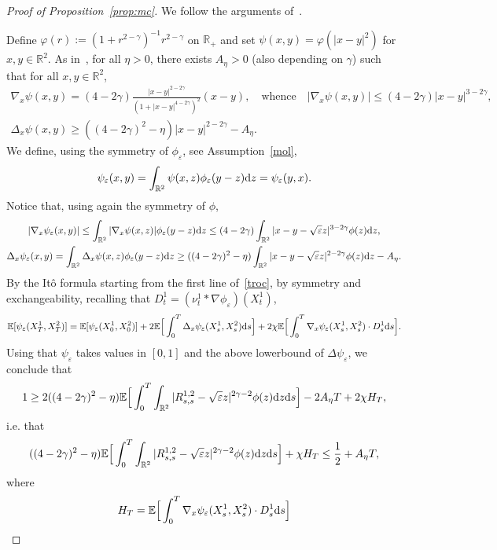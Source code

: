 \documentclass[11pt]{article}
\newcommand{\E}{\mathbb{E}}
\newcommand{\R}{\mathbb{R}}
\newcommand{\1}{\mathbbm{1}}
\newcommand{\dd}{{\rm d}}
\newcommand{\e}{\varepsilon}
\newcommand{\vip}{\vskip5pt}
\begin{document}
\begin{proof}[Proof of Proposition~\ref{prop:mc}]
We follow the arguments of~\cite[Proof of Proposition~8]{FT1}.

\vip

Define $\varphi(r):=(1+ r^{2-\gamma})^{-1}r^{2-\gamma}$ on $\R_+$ and set 
$\psi(x,y)=\varphi(|x-y|^2)$ for $x,y \in \R^2$. 
As in~\cite{FT1}, for all $\eta>0$, there exists $A_\eta>0$ (also depending on $\gamma$) such that for all $x,y \in \R^2$,
\begin{gather*}
\nabla_x \psi (x,y)= (4-2\gamma) \frac{|x-y|^{2-2\gamma}}{(1+|x-y|^{4-2\gamma})^2}(x-y), \quad \text{whence} \quad  |\nabla_x\psi(x,y)|\leq (4-2\gamma)|x-y|^{3-2\gamma},\\ 
\Delta_x \psi (x,y) \geq ((4-2\gamma)^2-\eta) |x-y|^{2-2\gamma}-A_\eta.
\end{gather*}
We define, using the symmetry of $\phi_\e$, see Assumption~\ref{mol},
$$
\psi_\e(x,y)=\int_{\R^2}\psi (x,z) \phi_\e(y-z)\dd z = \psi_\e(y,x).
$$
Notice that, using again the symmetry of $\phi$,
\begin{gather*}
|\nabla_x \psi_\e(x,y)|\leq \int_{\R^2} |\nabla_x \psi(x,z)|\phi_\e(y-z)\dd z
\leq (4-2\gamma) \int_{\R^2} |x-y-\sqrt{\e} z|^{3-2\gamma} \phi(z) \dd z,\\
\Delta_x \psi_\e(x,y)=\int_{\R^2} \Delta_x\psi (x,z) \phi_\e(y-z)\dd z  \geq 
((4-2\gamma)^2-\eta) \int_{\R^2} |x-y-\sqrt\e z|^{2-2\gamma}\phi(z)\dd z-A_\eta.
\end{gather*}
By the It\^o formula starting from the first line of~\eqref{troc}, by symmetry and exchangeability, recalling that $D^1_t= (\nu^1_t\ast \nabla \phi_\e)(X^1_t)$,
\begin{align*}
\E[\psi_\e (X^1_T,X^2_T)]=\E[\psi_\e (X^1_0,X^2_0)]+ 2\E\Big[\int_0^T \Delta_x \psi_\e (X^1_s,X^2_s) \dd s\Big]
+ 2\chi \E\Big[\int_0^T  \nabla_x \psi_\e (X^1_s,X^2_s) \cdot D^{1}_s\dd s  \Big].
\end{align*}
Using that $\psi_\e$ takes values in $[0,1]$ and the above lowerbound of $\Delta \psi_\e$, we conclude that
$$
1\geq 2 ((4-2\gamma)^2-\eta)\E\Big[\int_0^T\int_{\R^2} |R^{1,2}_{s,s}-\sqrt\e z|^{2\gamma-2} \phi(z)\dd z\dd s \Big] - 2A_\eta T+2 \chi H_T,
$$
i.e. that 
\begin{equation}\label{tbpi}
((4-2\gamma)^2-\eta)\E\Big[\int_0^T \int_{\R^2}|R^{1,2}_{s,s}-\sqrt\e z|^{2\gamma-2} \phi(z)\dd z \dd s \Big] +\chi H_T \leq  \frac 12+A_\eta T,
\end{equation}
where
$$
H_T=\E\Big[\int_0^T  \nabla_x \psi_\e (X^1_s,X^2_s) \cdot D^{1}_s\dd s  \Big]
$$
\end{proof}
\end{document}
